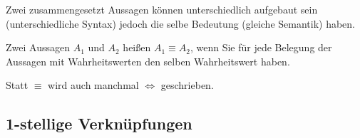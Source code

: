\begin{Unit}
Zwei zusammengesetzt Aussagen können unterschiedlich aufgebaut sein
(unterschiedliche Syntax) jedoch die selbe Bedeutung (gleiche Semantik) 
haben.

\begin{Definition}
Zwei Aussagen $A_1$ und $A_2$ heißen  
$A_1 \equiv A_2$, wenn Sie für jede Belegung der Aussagen mit 
Wahrheitswerten den selben Wahrheitswert haben.
\end{Definition}

Statt $\equiv$ wird auch manchmal $\Leftrightarrow$ geschrieben.
\end{Unit}

\subsection*{1-stellige Verknüpfungen}

